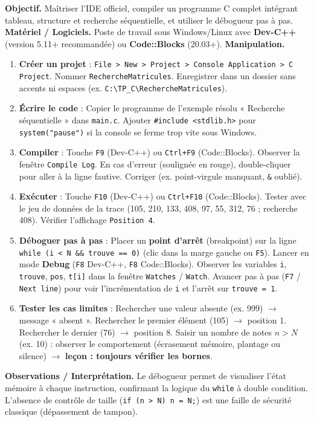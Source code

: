 \documentclass[11pt]{article}
\begin{document}
\begin{experience}
\textbf{Objectif.} Maîtriser l'IDE officiel, compiler un programme C complet intégrant tableau, structure et recherche séquentielle, et utiliser le débogueur pas à pas.
\textbf{Matériel / Logiciels.} Poste de travail sous Windows/Linux avec \textbf{Dev-C++} (version 5.11+ recommandée) ou \textbf{Code::Blocks} (20.03+).
\textbf{Manipulation.}
\begin{enumerate}
\item \textbf{Créer un projet} : \texttt{File > New > Project > Console Application > C Project}. Nommer \texttt{RechercheMatricules}. Enregistrer dans un dossier sans accents ni espaces (ex. \texttt{C:\textbackslash TP\_C\textbackslash RechercheMatricules}).
\item \textbf{Écrire le code} : Copier le programme de l'exemple résolu « Recherche séquentielle » dans \texttt{main.c}. Ajouter \texttt{\#include <stdlib.h>} pour \texttt{system("pause")} si la console se ferme trop vite sous Windows.
\item \textbf{Compiler} : Touche \texttt{F9} (Dev-C++) ou \texttt{Ctrl+F9} (Code::Blocks). Observer la fenêtre \texttt{Compile Log}. En cas d'erreur (soulignée en rouge), double-cliquer pour aller à la ligne fautive. Corriger (ex. point-virgule manquant, \texttt{\&} oublié).
\item \textbf{Exécuter} : Touche \texttt{F10} (Dev-C++) ou \texttt{Ctrl+F10} (Code::Blocks). Tester avec le jeu de données de la trace (105, 210, 133, 408, 97, 55, 312, 76 ; recherche 408). Vérifier l'affichage \texttt{Position 4}.
\item \textbf{Déboguer pas à pas} : Placer un \textbf{point d'arrêt} (breakpoint) sur la ligne \texttt{while (i < N \&\& trouve == 0)} (clic dans la marge gauche ou \texttt{F5}). Lancer en mode \textbf{Debug} (\texttt{F8} Dev-C++, \texttt{F8} Code::Blocks). Observer les variables \texttt{i}, \texttt{trouve}, \texttt{pos}, \texttt{t[i]} dans la fenêtre \texttt{Watches} / \texttt{Watch}. Avancer pas à pas (\texttt{F7} / \texttt{Next line}) pour voir l'incrémentation de \texttt{i} et l'arrêt sur \texttt{trouve = 1}.
\item \textbf{Tester les cas limites} : Rechercher une valeur absente (ex. 999) $\rightarrow$ message « absent ». Rechercher le premier élément (105) $\rightarrow$ position 1. Rechercher le dernier (76) $\rightarrow$ position 8. Saisir un nombre de notes $n > N$ (ex. 10) : observer le comportement (écrasement mémoire, plantage ou silence) $\rightarrow$ \textbf{leçon : toujours vérifier les bornes}.
\end{enumerate}
\textbf{Observations / Interprétation.} Le débogueur permet de visualiser l'état mémoire à chaque instruction, confirmant la logique du \texttt{while} à double condition. L'absence de contrôle de taille (\texttt{if (n > N) n = N;}) est une faille de sécurité classique (dépassement de tampon).
\end{experience}
\end{document}
